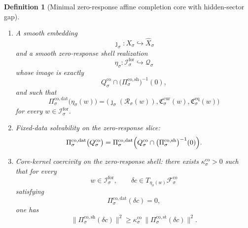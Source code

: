 \documentclass[11pt]{article}
\newcommand{\ForSpace}[1]{\mathcal I_{#1}^{\mathrm{for}}}
\newcommand{\Reduction}[1]{\mathcal R_{#1}}
\newcommand{\CurrentCarrier}[1]{\mathfrak C_{#1}^{\mathrm{cur}}}
\newcommand{\EqCarrier}[1]{\mathfrak C_{#1}^{\mathrm{eq}}}
\newcommand{\VisibleAffine}[1]{\widehat X_{#1}}
\newcommand{\DataSpace}[1]{\mathcal Y_{#1}^{\mathrm{obs}}}
\newcommand{\AmbientTarget}[1]{E_{#1}^{\mathrm{amb}}}
\newcommand{\GapSpace}[1]{H_{#1}}
\newcommand{\GapBody}[1]{D_{#1}}
\newcommand{\HiddenOperator}[1]{K_{#1}^{\mathrm{hid}}}
\newcommand{\CoreState}[1]{\mathcal C_{#1}}
\newcommand{\CoreSpace}[1]{\mathcal Q_{#1}}
\newcommand{\CoreAffine}[1]{\mathcal F_{#1}^{\mathrm{co}}}
\newcommand{\CoreBody}[1]{Q_{#1}^{\mathrm{co}}}
\newcommand{\CoreStateProj}[1]{\Pi_{#1}^{\mathrm{co,st}}}
\newcommand{\CoreDataProj}[1]{\Pi_{#1}^{\mathrm{co,dat}}}
\newcommand{\CoreShellProj}[1]{\Pi_{#1}^{\mathrm{co,sh}}}
\newcommand{\CoreTime}[1]{\tau_{#1}^{\mathrm{co}}}
\newcommand{\CoreEmbed}[1]{\eta_{#1}}
\newtheorem{definition}{Definition}
\begin{document}
\begin{definition}[Minimal zero-response affine completion core with hidden-sector gap]
\begin{enumerate}
\[    O(\CoreState{\sigma})\times
    O(\DataSpace{\sigma})\times
    O(\AmbientTarget{\sigma})\times
    O(\GapSpace{\sigma})
    \]
    and an orthogonal involution
    \[
    \CoreTime{\sigma}\in
    O(\CoreState{\sigma})\times
    O(\DataSpace{\sigma})\times
    O(\AmbientTarget{\sigma})\times
    O(\GapSpace{\sigma})
    \]
    preserving \(\CoreAffine{\sigma}\), \(\CoreBody{\sigma}\), the zero-response slice
    \[
    \CoreState{\sigma}\oplus \DataSpace{\sigma}\oplus\{0\},
    \]
    the hidden body \(\GapBody{\sigma}\), and \(\HiddenOperator{\sigma}\).
    \item A smooth embedding
    \[
    \jmath_{\sigma}:X_{\sigma}\hookrightarrow \VisibleAffine{\sigma}
    \]
    and a smooth zero-response shell realization
    \[
    \CoreEmbed{\sigma}:\ForSpace{\sigma}\hookrightarrow \CoreSpace{\sigma}
    \]
    whose image is exactly
    \[
    \CoreBody{\sigma}\cap
    \bigl(\CoreShellProj{\sigma}\bigr)^{-1}(0),
    \]
    and such that
    \begin{equation}
    \CoreDataProj{\sigma}\bigl(\CoreEmbed{\sigma}(w)\bigr)
    =
    \bigl(
    \jmath_{\sigma}(\Reduction{\sigma}(w)),
    \CurrentCarrier{\sigma}(w),
    \EqCarrier{\sigma}(w)
    \bigr)
    \label{eq:corecompat}
    \end{equation}
    for every \(w\in\ForSpace{\sigma}\).
    \item Fixed-data solvability on the zero-response slice:
    \begin{equation}
    \CoreDataProj{\sigma}\bigl(\CoreBody{\sigma}\bigr)
    =
    \CoreDataProj{\sigma}
    \Bigl(
    \CoreBody{\sigma}\cap
    \bigl(\CoreShellProj{\sigma}\bigr)^{-1}(0)
    \Bigr).
    \label{eq:coresolvability}
    \end{equation}
    \item Core-kernel coercivity on the zero-response shell: there exists \(\kappa_{\sigma}^{\mathrm{co}}>0\) such that for every
    \[
    w\in\ForSpace{\sigma},
    \qquad
    \delta c\in T_{\CoreEmbed{\sigma}(w)}\CoreAffine{\sigma}
    \]
    satisfying
    \[
    \CoreDataProj{\sigma}(\delta c)=0,
    \]
    one has
    \begin{equation}
    \bigl\|
    \CoreShellProj{\sigma}(\delta c)
    \bigr\|^{2}
    \ge
    \kappa_{\sigma}^{\mathrm{co}}\,
    \bigl\|
    \CoreStateProj{\sigma}(\delta c)
    \bigr\|^{2}.
    \label{eq:corecoercive}
    \end{equation}
\end{enumerate}
\end{definition}
\end{document}
